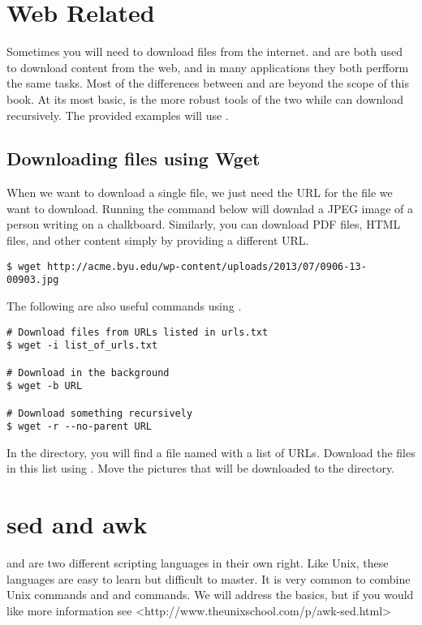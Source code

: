 \section*{Web Related}
Sometimes you will need to download files from the internet.
 and  are both used to download content from the web, and in many applications they both perfform the same tasks.
Most of the differences between  and  are beyond the scope of this book. 
At its most basic,  is the more robust tools of the two while  can download recursively.
The provided examples will use .

\subsection*{Downloading files using Wget}

When we want to download a single file, we just need the URL for the file we want to download.
Running the command below will downlad a JPEG image of a person writing on a chalkboard.
Similarly, you can download PDF files, HTML files, and other content simply by providing a different URL. 

\begin{lstlisting}
$ wget http://acme.byu.edu/wp-content/uploads/2013/07/0906-13-00903.jpg
\end{lstlisting}

The following are also useful commands using .

\begin{lstlisting}
# Download files from URLs listed in urls.txt
$ wget -i list_of_urls.txt

# Download in the background
$ wget -b URL

# Download something recursively
$ wget -r --no-parent URL
\end{lstlisting}

\begin{problem}
In the  directory, you will find a file named  with a list of URLs.
Download the files in this list using .
Move the pictures that will be downloaded to the  directory.
\end{problem}

\section*{sed and awk}
 and  are two different scripting languages in their own right.
Like Unix, these languages are easy to learn but difficult to master.
It is very common to combine Unix commands and  and  commands.
We will address the basics, but if you would like more information see <http://www.theunixschool.com/p/awk-sed.html>

